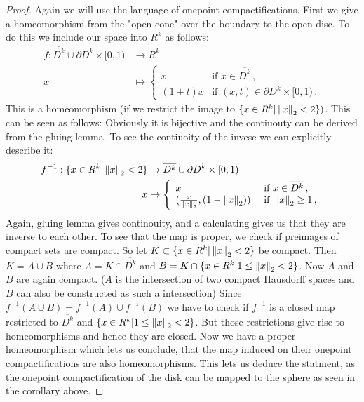 \begin{proof}
	Again we will use the language of onepoint compactifications. First we give a homeomorphism from the "open cone" over the boundary to the open disc. To do this we include our space into $R^k$ as follows:
	\begin{align*}
	f:	\overline{D^k}\cup \partial D^k \times [0,1) &\to R^{k}\\
		x								 &\mapsto
		 \left\{ \begin{array}{ll}
		 	x & \text{if } x \in \overline{D^k} \, , \\
		 	(1+t)x& \text{if } (x,t)\in \partial D^k \times [0,1) \, . 
		 \end{array}
		 \right.
	\end{align*} This is a homeomorphism (if we restrict the image to $\{x\in R^k| \left\lVert x\right\rVert_2<2\})$. This can be seen as follows:
	Obviously it is bijective and the contiuouty can be derived from the gluing lemma. To see the contiuoity of the invese we can explicitly describe it:
\begin{align*}
	f^{-1}: \{x\in R^k| \left\lVert x\right\rVert_2<2\}  &\to    \overline{D^k}\cup \partial D^k \times [0,1) \\
	x 									&\mapsto \left\{ 
	\begin{array}{ll}
		x & \text{ if } x\in \overline{D^k} \,,  \\
		(\frac{x}{\left\lVert x\right\rVert_2},(1-\left\lVert x\right\rVert_2)) & \text{ if } \left\lVert x\right\rVert_2\geq 1 \,,
	\end{array}
	\right.
\end{align*} Again, gluing lemma gives continouity, and a calculating gives us that they are inverse to each other. To see that the map is proper, we check if preimages of compact sets are compact. So let $K\subset \{x\in R^k| \left\lVert x\right\rVert_2<2\}$ be compact. Then $K=A\cup B$ where $A= K\cap \overline{D^k}$ and $B=K\cap \{x\in R^k| 1\leq \left\lVert x\right\rVert_2<2\}$. Now $A$ and $B$ are again compact. ($A$ is the intersection of two compact Hausdorff spaces and $B$ can also be constructed as such a intersection) Since $f^{-1}(A\cup B)=f^{-1}(A)\cup f^{-1}(B)$ we have to check if $f^{-1}$ is a closed map restricted to $\overline{D^k}$ and $\{x\in R^k| 1\leq \left\lVert x\right\rVert_2<2\}$. But those restrictions give rise to homeomorphisms and hence they are closed. 
Now we have a proper homeomorphism which lets us conclude, that the map induced on their onepoint compactifications are also homeomorphisms. This lets us deduce the statment, as the onepoint compactification of the disk can be mapped to the sphere as seen in the corollary above.
\end{proof}
